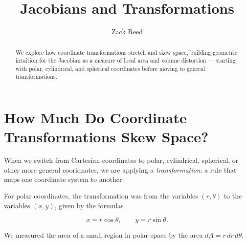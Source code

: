 \documentclass{ximera}
\title{Jacobians and Transformations}
\author{Zack Reed}
\begin{document}
\begin{abstract}
We explore how coordinate transformations stretch and skew space, building geometric intuition for the Jacobian as a measure of local area and volume distortion --- starting with polar, cylindrical, and spherical coordinates before moving to general transformations.
\end{abstract}
\maketitle

\section*{How Much Do Coordinate Transformations Skew Space?}

When we switch from Cartesian coordinates to polar, cylindrical, spherical, or other more general cooridnates, we are applying a \emph{transformation}: a rule that maps one coordinate system to another.  

For polar coordinates, the transformation was from the variables $(r,\theta)$ to the variables $(x,y)$, given by the formulas

\[x = r\cos\theta, \qquad y = r\sin\theta.\]

We measured the area of a small region in polar space by the area $dA = r\,dr\,d\theta$. 
\end{document}
